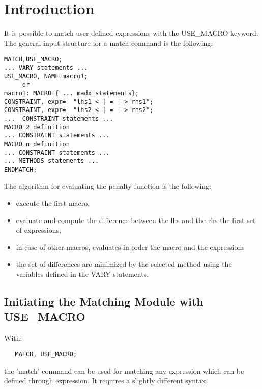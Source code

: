 


%

\section{ Introduction }
\label{sec:match_intro}
 
It is possible to match user defined expressions with the USE\_MACRO keyword.
The general input structure for a match command is the following:

\begin{verbatim}
MATCH,USE_MACRO;
... VARY statements ...
USE_MACRO, NAME=macro1;
     or
macro1: MACRO={ ... madx statements};
CONSTRAINT, expr=  "lhs1 < | = | > rhs1";
CONSTRAINT, expr=  "lhs2 < | = | > rhs2";
...  CONSTRAINT statements ...
MACRO 2 definition
... CONSTRAINT statements ...
MACRO n definition
... CONSTRAINT statements ...
... METHODS statements ...
ENDMATCH;
\end{verbatim}
 
The algorithm for evaluating the penalty function is the following:
 
\begin{itemize}
   \item  execute the first macro,
   \item  evaluate and compute the difference between the lhs and the
     rhs the first set of expressions, 
   \item in case of other macros, evaluates in order the macro and the
     expressions 
   \item  the set of differences are  minimized by the selected method
     using the variables defined in the VARY statements. 
\end{itemize}

\subsection{Initiating the Matching Module with USE\_MACRO}
 
 With:
\begin{verbatim}
   MATCH, USE_MACRO;
\end{verbatim}
the 'match' command can be used for matching any expression which can be
defined through expression. It requires a slightly different syntax.

